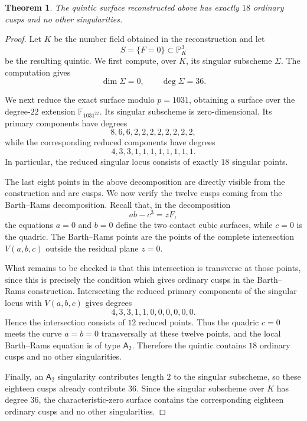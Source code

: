 \documentclass[10pt,a4paper]{article}
\newtheorem{theorem}{Theorem}
\begin{document}
\begin{theorem}
The quintic surface reconstructed above has exactly $18$ ordinary cusps and no
other singularities.
\end{theorem}

\begin{proof}
Let $K$ be the number field obtained in the reconstruction and let
\[
        S=\{F=0\}\subset\mathbb P^3_K
\]
be the resulting quintic.  We first compute, over $K$, its
singular subscheme $\Sigma$.
The computation gives
\[
        \dim\Sigma=0,\qquad \deg\Sigma=36.
\]

We next reduce the exact surface modulo $p=1031$, obtaining a surface over
the degree-$22$ extension $\mathbb F_{1031^{22}}$.
Its singular subscheme is zero-dimensional.
Its primary components have degrees
\[
        8,6,6,2,2,2,2,2,2,2,2,
\]
while the corresponding reduced components have degrees
\[
        4,3,3,1,1,1,1,1,1,1,1.
\]
In particular, the reduced singular locus consists of exactly $18$ singular points.


The last eight points in the above decomposition are directly visible from
the construction and are cusps.  We now verify the twelve cusps coming from
the Barth--Rams decomposition.  Recall that, in the decomposition
\[
        ab-c^3=zF,
\]
the equations $a=0$ and $b=0$ define the two contact cubic surfaces, while
$c=0$ is the quadric.  The Barth--Rams points are the points of the complete
intersection $V(a,b,c)$ outside the residual plane $z=0$.

What remains to be checked is that this intersection is transverse at those
points, since this is precisely the condition which gives ordinary cusps in
the Barth--Rams construction.  Intersecting the reduced primary components
of the singular locus with $V(a,b,c)$ gives degrees
\[
        4,3,3,1,1,0,0,0,0,0,0.
\]
Hence the intersection consists of $12$
reduced points.  Thus the quadric $c=0$ meets the curve $a=b=0$
transversally at these twelve points, and the local Barth--Rams equation is
of type $\mathsf A_2$.  Therefore the quintic contains $18$ ordinary cusps and
no other singularities.

Finally, an $\mathsf A_2$ singularity contributes
length $2$ to the singular subscheme, so these eighteen cusps already
contribute $36$.
Since the singular subscheme over $K$ has degree $36$,
the characteristic-zero surface contains the corresponding
eighteen ordinary cusps and no other singularities.

\end{proof}
\end{document}
